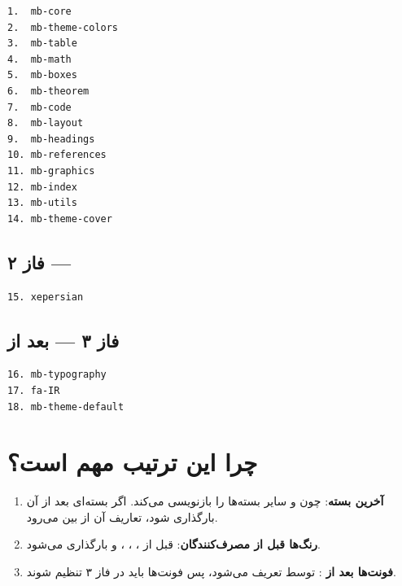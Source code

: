 \begin{latin}
\begin{verbatim}
1.  mb-core
2.  mb-theme-colors
3.  mb-table
4.  mb-math
5.  mb-boxes
6.  mb-theorem
7.  mb-code
8.  mb-layout
9.  mb-headings
10. mb-references
11. mb-graphics
12. mb-index
13. mb-utils
14. mb-theme-cover
\end{verbatim}
\end{latin}


\subsection{فاز ۲ — }
\label{sec:modules-phase2}

\begin{latin}
\begin{verbatim}
15. xepersian
\end{verbatim}
\end{latin}


\subsection{فاز ۳ — بعد از }
\label{sec:modules-phase3}

\begin{latin}
\begin{verbatim}
16. mb-typography
17. fa-IR
18. mb-theme-default
\end{verbatim}
\end{latin}


\section{چرا این ترتیب مهم است؟}
\label{sec:modules-why-order}

\begin{enumerate}
    \item \textbf{ آخرین بسته}:
    چون  و سایر بسته‌ها را بازنویسی
    می‌کند. اگر بسته‌ای بعد از آن بارگذاری
    شود، تعاریف آن از بین می‌رود.

    \item \textbf{رنگ‌ها قبل از مصرف‌کنندگان}:
     قبل از
    ، ،
    ،  و
     بارگذاری می‌شود.

    \item \textbf{فونت‌ها بعد از }:
     توسط 
    تعریف می‌شود، پس فونت‌ها باید در فاز ۳
    تنظیم شوند.
\end{enumerate}

